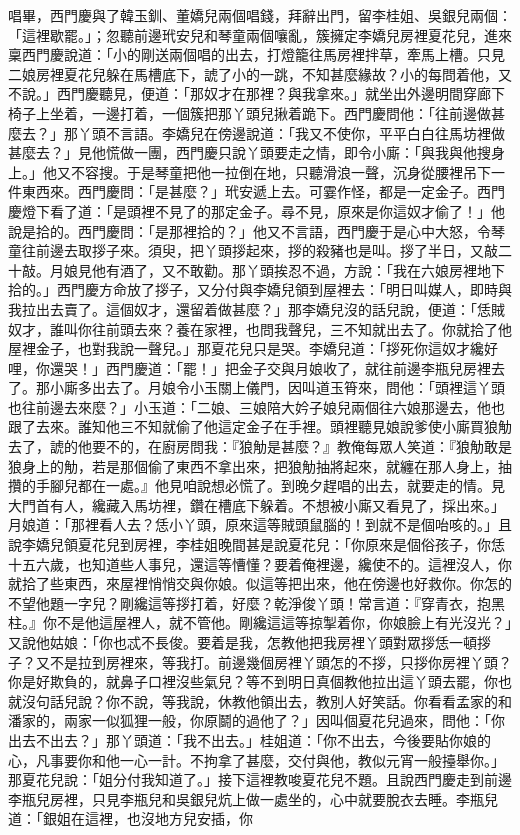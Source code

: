 \begin{showcontents}{}
唱畢，西門慶與了韓玉釧、董嬌兒兩個唱錢，拜辭出門，留李桂姐、吳銀兒兩個：「這裡歇罷。」；忽聽前邊玳安兒和琴童兩個嚷亂，簇擁定李嬌兒房裡夏花兒，進來稟西門慶說道：「小的剛送兩個唱的出去，打燈籠往馬房裡拌草，牽馬上槽。只見二娘房裡夏花兒躲在馬槽底下，諕了小的一跳，不知甚麼緣故？小的每問着他，又不說。」西門慶聽見，便道：「那奴才在那裡？與我拿來。」就坐出外邊明間穿廊下椅子上坐着，一邊打着，一個簇把那丫頭兒揪着跪下。西門慶問他：「往前邊做甚麼去？」那丫頭不言語。李嬌兒在傍邊說道：「我又不使你，平平白白往馬坊裡做甚麼去？」見他慌做一團，西門慶只說丫頭要走之情，即令小廝：「與我與他搜身上。」他又不容搜。于是琴童把他一拉倒在地，只聽滑浪一聲，沉身從腰裡吊下一件東西來。西門慶問：「是甚麼？」玳安遞上去。可霎作怪，都是一定金子。西門慶燈下看了道：「是頭裡不見了的那定金子。尋不見，原來是你這奴才偷了！」他說是拾的。西門慶問：「是那裡拾的？」他又不言語，西門慶于是心中大怒，令琴童往前邊去取拶子來。須臾，把丫頭拶起來，拶的殺豬也是叫。拶了半日，又敲二十敲。月娘見他有酒了，又不敢勸。那丫頭挨忍不過，方說：「我在六娘房裡地下拾的。」西門慶方命放了拶子，又分付與李嬌兒領到屋裡去：「明日叫媒人，即時與我拉出去賣了。這個奴才，還留着做甚麼？」那李嬌兒沒的話兒說，便道：「恁賊奴才，誰叫你往前頭去來？養在家裡，也問我聲兒，三不知就出去了。你就拾了他屋裡金子，也對我說一聲兒。」那夏花兒只是哭。李嬌兒道：「拶死你這奴才纔好哩，你還哭！」西門慶道：「罷！」把金子交與月娘收了，就往前邊李瓶兒房裡去了。那小廝多出去了。月娘令小玉關上儀門，因叫道玉筲來，問他：「頭裡這丫頭也往前邊去來麼？」小玉道：「二娘、三娘陪大妗子娘兒兩個往六娘那邊去，他也跟了去來。誰知他三不知就偷了他這定金子在手裡。頭裡聽見娘說爹使小廝買狼觔去了，諕的他要不的，在廚房問我：『狼觔是甚麼？』教俺每眾人笑道：『狼觔敢是狼身上的觔，若是那個偷了東西不拿出來，把狼觔抽將起來，就纏在那人身上，抽攢的手腳兒都在一處。』他見咱說想必慌了。到晚夕趕唱的出去，就要走的情。見大門首有人，纔藏入馬坊裡，鑽在槽底下躲着。不想被小廝又看見了，採出來。」月娘道：「那裡看人去？恁小丫頭，原來這等賊頭鼠腦的！到就不是個咍咳的。」且說李嬌兒領夏花兒到房裡，李桂姐晚間甚是說夏花兒：「你原來是個俗孩子，你恁十五六歲，也知道些人事兒，還這等慒懂？要着俺裡邊，纔使不的。這裡沒人，你就拾了些東西，來屋裡悄悄交與你娘。似這等把出來，他在傍邊也好救你。你怎的不望他題一字兒？剛纔這等拶打着，好麼？乾淨俊丫頭！常言道：『穿青衣，抱黑柱。』你不是他這屋裡人，就不管他。剛纔這這等掠掣着你，你娘臉上有光沒光？」又說他姑娘：「你也忒不長俊。要着是我，怎教他把我房裡丫頭對眾拶恁一頓拶子？又不是拉到房裡來，等我打。前邊幾個房裡丫頭怎的不拶，只拶你房裡丫頭？你是好欺負的，就鼻子口裡沒些氣兒？等不到明日真個教他拉出這丫頭去罷，你也就沒句話兒說？你不說，等我說，休教他領出去，教別人好笑話。你看看孟家的和潘家的，兩家一似狐狸一般，你原鬬的過他了？」因叫個夏花兒過來，問他：「你出去不出去？」那丫頭道：「我不出去。」桂姐道：「你不出去，今後要貼你娘的心，凡事要你和他一心一計。不拘拿了甚麼，交付與他，教似元宵一般擡舉你。」那夏花兒說：「姐分付我知道了。」接下這裡教唆夏花兒不題。且說西門慶走到前邊李瓶兒房裡，只見李瓶兒和吳銀兒炕上做一處坐的，心中就要脫衣去睡。李瓶兒道：「銀姐在這裡，也沒地方兒安插，你
\end{showcontents}

